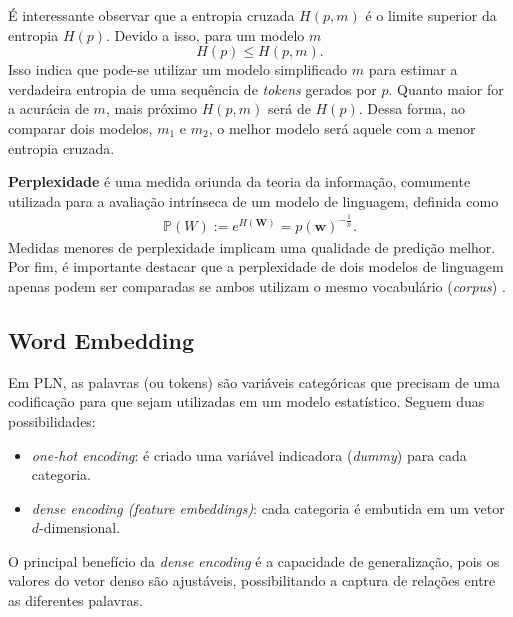 \documentclass{automatextcc}
\newcommand{\Perp}{\mathds{P}}
\newcommand{\bs}[1]{\boldsymbol{#1}}
\begin{document}
É interessante observar que a entropia cruzada $H(p,m)$ é o limite superior da entropia $H(p)$. Devido a isso, para um modelo $m$
\begin{equation*}
    H(p) \leq H(p,m).
\end{equation*}
Isso indica que pode-se utilizar um modelo simplificado $m$ para estimar a verdadeira entropia de uma sequência de \textit{tokens} gerados por $p$. Quanto maior for a acurácia de $m$, mais próximo $H(p,m)$ será de $H(p)$. Dessa forma, ao comparar dois modelos, $m_1$ e $m_2$, o melhor modelo será aquele com a menor entropia cruzada.

\textbf{Perplexidade} é uma medida oriunda da teoria da informação, comumente utilizada para a avaliação intrínseca de um modelo de linguagem, definida como
\begin{align*}
    \Perp (W) := e^{H(\bs{W})} = p(\bs{w})^{-\frac{1}{n}}.
\end{align*}
Medidas menores de perplexidade implicam uma qualidade de predição melhor. Por fim, é importante destacar que a perplexidade de dois modelos de linguagem apenas podem ser comparadas se ambos utilizam o mesmo vocabulário (\textit{corpus}) \citep{manning1999, kamath2019, jurafsky2021}.



\subsection{Word Embedding}
Em PLN, as palavras (ou tokens) são variáveis categóricas que precisam de uma codificação para que sejam utilizadas em um modelo estatístico. Seguem duas possibilidades:
\begin{itemize}
    \item \textit{one-hot encoding}: é criado uma variável indicadora (\textit{dummy}) para cada categoria.
    \item \textit{dense encoding (feature embeddings)}: cada categoria é embutida em um vetor $d$-dimensional.
\end{itemize}
O principal benefício da \textit{dense encoding} é a capacidade de generalização, pois os valores do vetor denso são ajustáveis, possibilitando a captura de relações entre as diferentes palavras.
\end{document}
